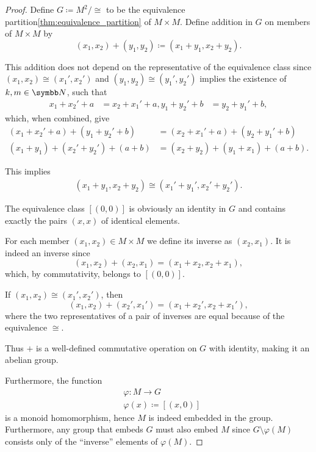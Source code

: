 \begin{proof}
  Define \( G \coloneqq M^2 / \cong \) to be the equivalence partition\cref{thm:equivalence_partition} of \( M \times M \). Define addition in \( G \) on members of \( M \times M \) by
  \begin{equation*}
    (x_1, x_2) + (y_1, y_2)
    \coloneqq
    (x_1 + y_1, x_2 + y_2).
  \end{equation*}

  This addition does not depend on the representative of the equivalence class since \( (x_1, x_2) \cong (x_1', x_2') \) and \( (y_1, y_2) \cong (y_1', y_2') \) implies the existence of \( k, m \in \N \), such that
  \begin{align*}
    x_1 + x_2' + a &= x_2 + x_1' + a,
    y_1 + y_2' + b &= y_2 + y_1' + b,
  \end{align*}
  which, when combined, give
  \begin{align*}
    (x_1 + x_2' + a) + (y_1 + y_2' + b)
    &=
    (x_2 + x_1' + a) + (y_2 + y_1' + b)
    \\
    (x_1 + y_1) + (x_2' + y_2') + (a + b)
    &=
    (x_2 + y_2) + (y_1 + x_1) + (a + b).
  \end{align*}

  This implies
  \begin{align*}
    (x_1 + y_1, x_2 + y_2)
    \cong
    (x_1' + y_1', x_2' + y_2').
  \end{align*}

  The equivalence class \( [(0, 0)] \) is obviously an identity in \( G \) and contains exactly the pairs \( (x, x) \) of identical elements.

  For each member \( (x_1, x_2) \in M \times M \) we define its inverse as \( (x_2, x_1) \). It is indeed an inverse since
  \begin{equation*}
    (x_1, x_2) + (x_2, x_1) = (x_1 + x_2, x_2 + x_1),
  \end{equation*}
  which, by commutativity, belongs to \( [(0, 0)] \).

  If \( (x_1, x_2) \cong (x_1', x_2') \), then
  \begin{equation*}
    (x_1, x_2) + (x_2', x_1')
    =
    (x_1 + x_2', x_2 + x_1'),
  \end{equation*}
  where the two representatives of a pair of inverses are equal because of the equivalence \( \cong \).

  Thus \( + \) is a well-defined commutative operation on \( G \) with identity, making it an abelian group.

  Furthermore, the function
  \begin{align*}
    &\varphi: M \to G \\
    &\varphi(x) \coloneqq [(x, 0)]
  \end{align*}
  is a monoid homomorphism, hence \( M \) is indeed embedded in the group. Furthermore, any group that embeds \( G \) must also embed \( M \) since \( G \setminus \varphi(M) \) consists only of the \enquote{inverse} elements of \( \varphi(M) \).
\end{proof}


